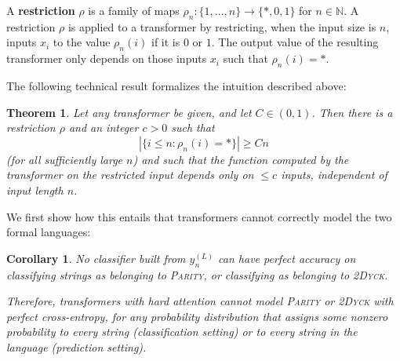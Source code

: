 \documentclass[11pt,a4paper]{article}
\newcounter{theorem}
\newtheorem{corollary}[theorem]{Corollary}
\newtheorem{thm}[theorem]{Theorem}
\newcommand{\key}[1]{\textbf{#1}}
\begin{document}
A \key{restriction} $\rho$ is a family of maps $\rho_n : \{1, \dots, n\} \rightarrow \{*, 0, 1\}$ for $n \in \mathbb{N}$.
A restriction $\rho$ is applied to a transformer by restricting, when the input size is $n$, inputs $x_i$ to the value $\rho_n(i)$ if it is $0$ or $1$.
The output value of the resulting transformer only depends on those inputs $x_i$ such that $\rho_n(i) = *$.

The following technical result formalizes the intuition described above:
\begin{thm}\label{thm:hardmax-main}
Let any transformer be given, and let $C \in (0,1)$.
Then there is a restriction $\rho$ and an integer $c > 0$ such that 
$$|\{i \leq n: \rho_n(i) = *\}| \geq Cn$$
(for all sufficiently large $n$) and such that the function computed by the transformer on the restricted input depends only on $\leq c$ inputs, independent of input length $n$.
\end{thm}
We first show how this entails that transformers cannot correctly model the two formal languages:
\begin{corollary}
No classifier built from $y_n^{(L)}$ can have perfect accuracy on classifying strings as belonging to \textsc{Parity}, or classifying as belonging to \textsc{2Dyck}.

Therefore, transformers with hard attention cannot model \textsc{Parity} or \textsc{2Dyck} with perfect cross-entropy, for \emph{any} probability distribution that assigns some nonzero probability to every string (classification setting) or to every string in the language (prediction setting). %
\end{corollary}
\end{document}
